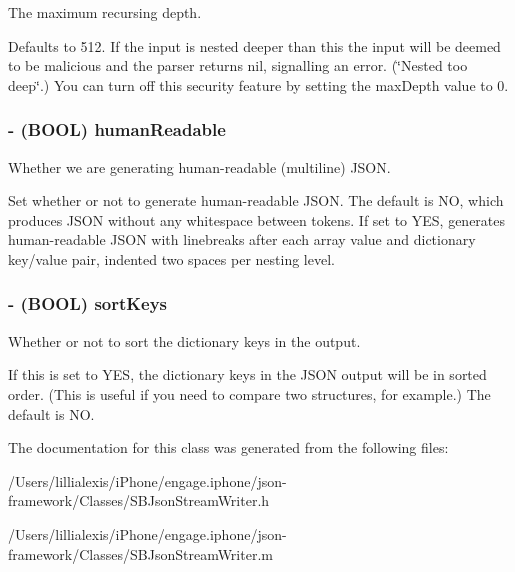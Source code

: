 The maximum recursing depth. 

Defaults to 512. If the input is nested deeper than this the input will be deemed to be malicious and the parser returns nil, signalling an error. (\char`\"{}Nested too deep\char`\"{}.) You can turn off this security feature by setting the maxDepth value to 0. \hypertarget{interface_s_b_json_stream_writer_af43e8bd7170d6128480515f532b7b791}{
\subsubsection[{humanReadable}]{\setlength{\rightskip}{0pt plus 5cm}-\/ (BOOL) humanReadable}}
\label{interface_s_b_json_stream_writer_af43e8bd7170d6128480515f532b7b791}


Whether we are generating human-\/readable (multiline) JSON. 

Set whether or not to generate human-\/readable JSON. The default is NO, which produces JSON without any whitespace between tokens. If set to YES, generates human-\/readable JSON with linebreaks after each array value and dictionary key/value pair, indented two spaces per nesting level. \hypertarget{interface_s_b_json_stream_writer_ab206c6844a0fd20307b5dfe881e17bf2}{
\subsubsection[{sortKeys}]{\setlength{\rightskip}{0pt plus 5cm}-\/ (BOOL) sortKeys}}
\label{interface_s_b_json_stream_writer_ab206c6844a0fd20307b5dfe881e17bf2}


Whether or not to sort the dictionary keys in the output. 

If this is set to YES, the dictionary keys in the JSON output will be in sorted order. (This is useful if you need to compare two structures, for example.) The default is NO. 

The documentation for this class was generated from the following files:\begin{DoxyCompactItemize}
\item 
/Users/lillialexis/iPhone/engage.iphone/json-\/framework/Classes/SBJsonStreamWriter.h\item 
/Users/lillialexis/iPhone/engage.iphone/json-\/framework/Classes/SBJsonStreamWriter.m\end{DoxyCompactItemize}
